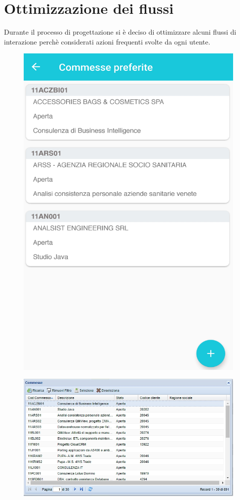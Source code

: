 \documentclass[12pt]{report}
\begin{document}
\section{Ottimizzazione dei flussi}
Durante il processo di progettazione si è deciso di ottimizzare alcuni flussi di interazione perchè considerati azioni frequenti svolte da ogni utente. 
\begin{multicols}{2}
	\begin{figure}[H]
		\centering
		\includegraphics[width=0.8\linewidth]{immagini/commesse_pref}
		\caption{}
		\label{fig:commessepref}
	\end{figure}
	\begin{figure}[H]
		\centering
		\includegraphics[width=1.2\linewidth]{immagini/inserimento commessa}
		\caption{}
		\label{fig:inscommessa}
	\end{figure}
\end{multicols}
\end{document}
